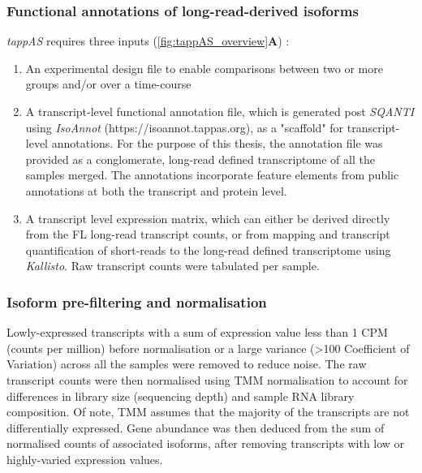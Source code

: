 \clearpage
\subsubsection{Functional annotations of long-read-derived isoforms}
\textit{tappAS} requires three inputs (\cref{fig:tappAS_overview}\textbf{A}) :
\begin{enumerate}
	\item An experimental design file to enable comparisons between two or more groups and/or over a time-course 
	\item A transcript-level functional annotation file, which is generated post \textit{SQANTI} using \textit{IsoAnnot} (https://isoannot.tappas.org), as a "scaffold" for transcript-level annotations. For the purpose of this thesis, the annotation file was provided as a conglomerate, long-read defined transcriptome of all the samples merged. The annotations incorporate feature elements from public annotations at both the transcript and protein level. 
	\item A transcript level expression matrix, which can either be derived directly from the FL long-read transcript counts, or from mapping and transcript quantification of short-reads to the long-read defined transcriptome using \textit{Kallisto}\cite{Bray2016}. Raw transcript counts were tabulated per sample.  	 
\end{enumerate}


\subsubsection{Isoform pre-filtering and normalisation}
Lowly-expressed transcripts with a sum of expression value less than 1 CPM (counts per million) before normalisation or a large variance (>100 Coefficient of Variation) across all the samples were removed to reduce noise. The raw transcript counts were then normalised using TMM normalisation \cite{Robinson2010} to account for differences in library size (sequencing depth) and sample RNA library composition. Of note, TMM assumes that the majority of the transcripts are not differentially expressed. Gene abundance was then deduced from the sum of normalised counts of associated isoforms, after removing transcripts with low or highly-varied expression values. 
 

